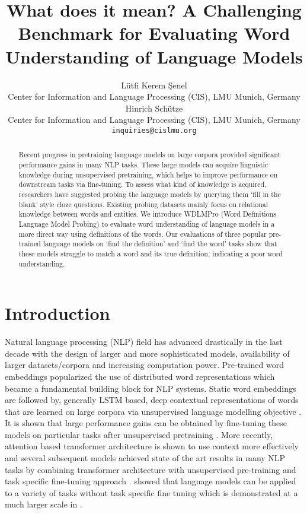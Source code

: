 \documentclass[11pt,a4paper]{article}
\title{What does it mean? A Challenging Benchmark for Evaluating Word Understanding of Language Models}
\author{Lütfi Kerem Şenel \\
  Center for Information and Language Processing (CIS), LMU Munich, Germany \\
  Hinrich Schütze \\
    Center for Information and Language Processing (CIS), LMU Munich, Germany \\
  \texttt{inquiries@cislmu.org} \\
  }
\date{}
\begin{document}
\maketitle
\begin{abstract}

Recent progress in pretraining language models on large corpora provided significant performance gains in many NLP tasks. These large models can acquire linguistic knowledge during unsupervised pretraining, which helps to improve performance on downstream tasks via fine-tuning. To assess what kind of knowledge is acquired, researchers have suggested probing the language models by querying them `fill in the blank' style cloze questions. Existing probing datasets mainly focus on relational knowledge between words and entities. We introduce WDLMPro (Word Definitions Language Model Probing) to evaluate word understanding of language models in a more direct way using definitions of the words. Our evaluations of three popular pre-trained language models on `find the definition' and `find the word' tasks show that these models struggle to match a word and its true definition, indicating a poor word understanding.

\end{abstract}

\section{Introduction}

Natural language processing (NLP) field has advanced drastically in the last decade with the design of larger and more sophisticated models, availability of larger datasets/corpora and increasing computation power. Pre-trained word embeddings \cite{mikolov13word2vec_b, pennington14glove} popularized the use of distributed word representations which became a fundamental building block for NLP systems. Static word embeddings are followed by, generally LSTM based, deep contextual representations of words that are learned on large corpora via unsupervised language modelling objective \cite{peters18ELMO}. It is shown that large performance gains can be obtained by fine-tuning these models on particular tasks after unsupervised pretraining \cite{radford18fineTuning, howard18ULMFiT}. More recently, attention based transformer architecture is shown to use context more effectively \cite{vaswani17transformers} and several subsequent models achieved state of the art results in many NLP tasks by combining transformer architecture with unsupervised pre-training and task specific fine-tuning approach \cite{devlin19BERT, liu19RoBERTa}. \cite{Radford19GPT2} showed that language models can be applied to a variety of tasks without task specific fine tuning which is demonstrated at a much larger scale in \cite{brown20GPT3}. 
\end{document}
